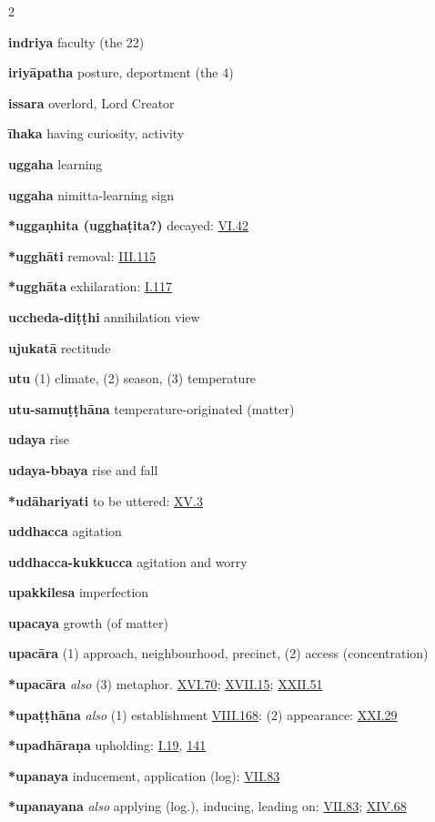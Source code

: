 \begin{multicols}{2}
\begin{vismHanging}
\par\textbf{indriya} faculty (the 22)
\par\textbf{iriyāpatha} posture, deportment (the 4)
\par\textbf{issara} overlord, Lord Creator
\par\textbf{īhaka} having curiosity, activity
\par\textbf{uggaha} learning
\par\textbf{uggaha} nimitta-learning sign
\par\textbf{*uggaṇhita (ugghaṭita?)} decayed: \hyperlink{VI.42}{VI.42}{}
\par\textbf{*ugghāti} removal: \hyperlink{III.115}{III.115}{}
\par\textbf{*ugghāta} exhilaration: \hyperlink{I.117}{I.117}{}
\par\textbf{uccheda-diṭṭhi} annihilation view
\par\textbf{ujukatā} rectitude
\par\textbf{utu} (1) climate, (2) season, (3) temperature
\par\textbf{utu-samuṭṭhāna} temperature-originated (matter)
\par\textbf{udaya} rise
\par\textbf{udaya-bbaya} rise and fall 
\par\textbf{*udāhariyati} to be uttered: \hyperlink{XV.3}{XV.3}{} 
\par\textbf{uddhacca} agitation
\par\textbf{uddhacca-kukkucca} agitation and worry
\par\textbf{upakkilesa} imperfection
\par\textbf{upacaya} growth (of matter)
\par\textbf{upacāra} (1) approach, neighbourhood, precinct, (2) access (concentration) 
\par\textbf{*upacāra} \emph{also }(3) metaphor. \hyperlink{XVI.70}{XVI.70}{}; \hyperlink{XVII.15}{XVII.15}{}; \hyperlink{XXII.51}{XXII.51}{} 
\par\textbf{*upaṭṭhāna} \emph{also }(1) establishment \hyperlink{VIII.168}{VIII.168}{}: (2) appearance: \hyperlink{XXI.29}{XXI.29}{} 
\par\textbf{*upadhāraṇa} upholding: \hyperlink{I.19}{I.19}{}, \hyperlink{I.141}{141}{}
\par\textbf{*upanaya} inducement, application (log): \hyperlink{VII.83}{VII.83}{} 
\par\textbf{*upanayana} \emph{also }applying (log.), inducing, leading on: \hyperlink{VII.83}{VII.83}{}; \hyperlink{XIV.68}{XIV.68}{}

\end{vismHanging}
\end{multicols}
